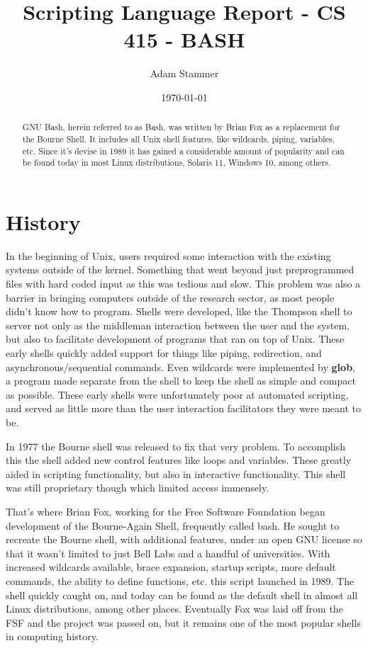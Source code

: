 \documentclass[prb,preprint]{revtex4-1}
\begin{document}
\title{Scripting Language Report - CS 415 - BASH}
\author{Adam Stammer}

\date{\today}

\begin{abstract}
GNU Bash, herein referred to as Bash, was written by Brian Fox as a replacement for the Bourne Shell. It includes all Unix shell features, like wildcards, piping, variables, etc. Since it's devise in 1989 it has gained a considerable amount of popularity and can be found today in most Linux distributions, Solaris 11, Windows 10, among others. 
\end{abstract}

\maketitle




\section*{History}
In the beginning of Unix, users required some interaction with the existing systems outside of the kernel. Something that went beyond just preprogrammed files with hard coded input as this was tedious and slow. This problem was also a barrier in bringing computers outside of the research sector, as most people didn't know how to program. Shells were developed, like the Thompson shell to server not only as the middleman interaction between the user and the system, but also to facilitate development of programs that ran on top of Unix. These early shells quickly added support for things like piping, redirection, and asynchronous/sequential commands. Even wildcards were implemented by \textbf{glob}, a program made separate from the shell to keep the shell as simple and compact as possible. These early shells were unfortunately poor at automated scripting, and served as little more than the user interaction facilitators they were meant to be.

In 1977 the Bourne shell was released to fix that very problem. To accomplish this the shell added new control features like loops and variables. These greatly aided in scripting functionality, but also in interactive functionality. This shell was still proprietary though which limited access immensely.

That's where Brian Fox, working for the Free Software Foundation began development of the Bourne-Again Shell, frequently called bash. He sought to recreate the Bourne shell, with additional features, under an open GNU license so that it wasn't limited to just Bell Labs and a handful of universities. With increased wildcards available, brace expansion, startup scripts, more default commands, the ability to define functions, etc. this script launched in 1989. The shell quickly caught on, and today can be found as the default shell in almost all Linux distributions, among other places. Eventually Fox was laid off from the FSF and the project was passed on, but it remains one of the most popular shells in computing history.
\end{document}
